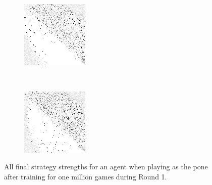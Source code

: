 \begin{figure}
\begin{subfigure}[t]{0.22\textwidth}
		\caption{\peggingmaxavggained}
	\end{subfigure}
~
	\begin{subfigure}[t]{0.22\textwidth}
		\includegraphics[width=\textwidth]{images/findings/round1/strategies_peggingmaxmedgained_pone.png}
		\caption{\peggingmaxmedgained}
	\end{subfigure}
	~
	\begin{subfigure}[t]{0.22\textwidth}
		\includegraphics[width=\textwidth]{images/findings/round1/strategies_peggingminavggiven_pone.png}
		\caption{\peggingminavggiven}
	\end{subfigure}

\caption{
	All final strategy strengths for an agent
	when playing as the pone
	after training for one million games during Round 1.
}
\label{fig_r1-strats-pone}
\end{figure}

